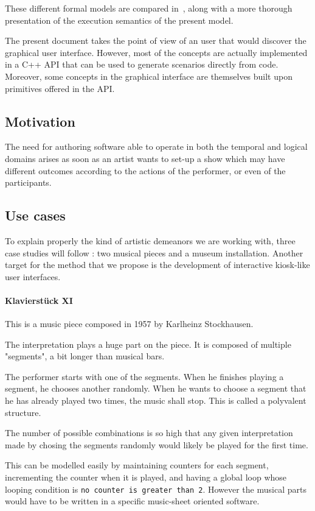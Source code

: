 \documentclass{sigchi}
\begin{document}
These different formal models are compared in~\cite{celerier2015ossia}, along with a more thorough presentation of the execution semantics of the present model.

The present document takes the point of view of an user that would discover the graphical user interface. However, most of the concepts are actually implemented in a C++ API\cite{hogue2014ossia} that can be used to generate scenarios directly from code. Moreover, some concepts in the graphical interface are themselves built upon primitives offered in the API.

\subsection{Motivation}
The need for authoring software able to operate in both the temporal and logical domains arises as soon as an artist wants to set-up a show which may have different outcomes according to the actions of the performer, or even of the participants.

\subsection{Use cases}
To explain properly the kind of artistic demeanors we are working with, three case studies will follow : two musical pieces and a museum installation. Another target for the method that we propose is the development of interactive kiosk-like user interfaces.

\paragraph{Klavierst\"uck XI}
This is a music piece composed in 1957 by Karlheinz Stockhausen.

The interpretation plays a huge part on the piece. It is composed of multiple "segments", a bit longer than musical bars.

The performer starts with one of the segments. When he finishes playing a segment, he chooses another randomly. When he wants to choose a segment that he has already played two times, the music shall stop. This is called a polyvalent structure.

The number of possible combinations is so high that any given interpretation made by chosing the segments randomly would likely be played for the first time.

This can be modelled easily by maintaining counters for each segment, incrementing the counter when it is played, and having a global loop whose looping condition is \texttt{no counter is greater than 2}. However the musical parts would have to be written in a specific music-sheet oriented software.
\end{document}
